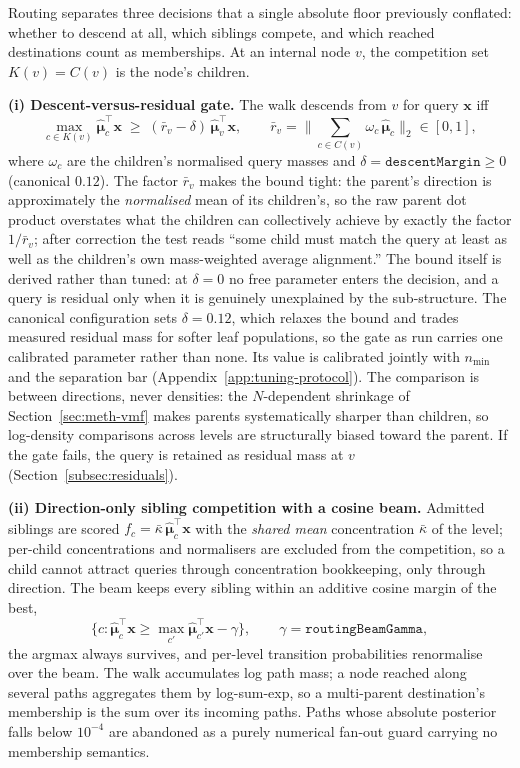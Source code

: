 Routing separates three decisions that a single absolute floor
previously conflated: whether to descend at all, which siblings
compete, and which reached destinations count as memberships.
At an internal node $v$, the competition set $K(v) = C(v)$ is the
node's children.

\textbf{(i) Descent-versus-residual gate.}
The walk descends from $v$ for query $\mathbf{x}$ iff
\[
\max_{c \in K(v)}
\hat{\boldsymbol{\mu}}_c^\top \mathbf{x}
\;\geq\;
(\bar{r}_v - \delta)\,
\hat{\boldsymbol{\mu}}_v^\top \mathbf{x},
\qquad
\bar{r}_v
= \Big\| \sum_{c \in C(v)} \omega_c\, \hat{\boldsymbol{\mu}}_c \Big\|_2
\in [0,1],
\]
where $\omega_c$ are the children's normalised query masses and
$\delta = \texttt{descentMargin} \geq 0$ (canonical $0.12$).
The factor $\bar{r}_v$ makes the bound tight: the parent's direction
is approximately the \emph{normalised} mean of its children's, so the
raw parent dot product overstates what the children can collectively
achieve by exactly the factor $1/\bar{r}_v$; after correction the
test reads ``some child must match the query at least as well as the
children's own mass-weighted average alignment.''
The bound itself is derived rather than tuned: at $\delta = 0$ no free
parameter enters the decision, and a query is residual only when it is
genuinely unexplained by the sub-structure.
The canonical configuration sets $\delta = 0.12$, which relaxes the
bound and trades measured residual mass for softer leaf populations,
so the gate as run carries one calibrated parameter rather than none.
Its value is calibrated jointly with $n_{\min}$ and the separation bar
(Appendix~\ref{app:tuning-protocol}).
The comparison is between directions, never densities: the
$N$-dependent shrinkage of Section~\ref{sec:meth-vmf} makes parents
systematically sharper than children, so log-density comparisons
across levels are structurally biased toward the parent.
If the gate fails, the query is retained as residual mass at $v$
(Section~\ref{subsec:residuals}).

\textbf{(ii) Direction-only sibling competition with a cosine beam.}
Admitted siblings are scored
$f_c = \bar{\kappa}\,\hat{\boldsymbol{\mu}}_c^\top \mathbf{x}$ with
the \emph{shared mean} concentration $\bar{\kappa}$ of the level;
per-child concentrations and normalisers are excluded from the
competition, so a child cannot attract queries through concentration
bookkeeping, only through direction.
The beam keeps every sibling within an additive cosine margin of the
best,
\[
\Big\{ c :
\hat{\boldsymbol{\mu}}_c^\top \mathbf{x}
\geq
\max_{c'} \hat{\boldsymbol{\mu}}_{c'}^\top \mathbf{x} - \gamma
\Big\},
\qquad \gamma = \texttt{routingBeamGamma},
\]
the argmax always survives, and per-level transition probabilities
renormalise over the beam.
The walk accumulates log path mass; a node reached along several
paths aggregates them by log-sum-exp, so a multi-parent destination's
membership is the sum over its incoming paths.
Paths whose absolute posterior falls below $10^{-4}$ are abandoned as
a purely numerical fan-out guard carrying no membership semantics.

